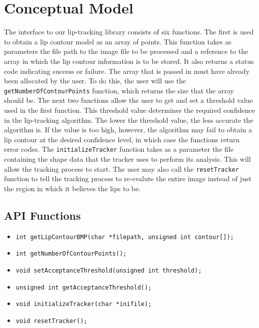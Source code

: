 \chapter{Conceptual Model}

The interface to our lip-tracking library consists of six functions. The first is used to obtain a lip contour model as an array of points. This function takes as parameters the file path to the image file to be processed and a reference to the array in which the lip contour information is to be stored. It also returns a status code indicating success or failure. The array that is passed in must have already been allocated by the user. To do this, the user will use the \texttt{getNumberOfContourPoints} function, which returns the size that the array should be. The next two functions allow the user to get and set a threshold value used in the first function. This threshold value determines the required confidence in the lip-tracking algorithm. The lower the threshold value, the less accurate the algorithm is. If the value is too high, however, the algorithm may fail to obtain a lip contour at the desired confidence level, in which case the functions return error codes. The \texttt{initializeTracker} function takes as a parameter the file containing the shape data that the tracker uses to perform its analysis. This will allow the tracking process to start. The user may also call the \texttt{resetTracker} function to tell the tracking process to re-evalute the entire image instead of just the region in which it believes the lips to be.

\section{API Functions}
\begin{itemize}
\item \texttt{int getLipContourBMP(char *filepath, unsigned int contour[]);}
\item \texttt{int getNumberOfContourPoints();}
\item \texttt{void setAcceptanceThreshold(unsigned int threshold);}
\item \texttt{unsigned int getAcceptanceThreshold();}
\item \texttt{void initializeTracker(char *inifile);}
\item \texttt{void resetTracker();}
\end{itemize}